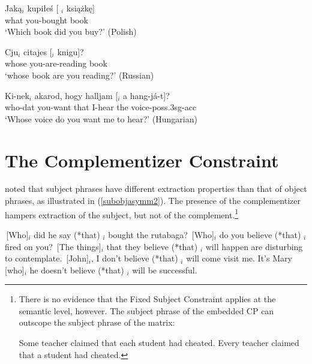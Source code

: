 \documentclass[output=paper]{langsci/langscibook}
\begin{document}
\ea
 \ea \gll Jak\k{a}$_i$  kupi\l{}e\'{s} { [ \spc$_i$ } ksi\k{a}\.{z}k\k{e}]\\
     what  you-bought  {} book\\
    \glt `Which book did you buy?' \hfill (Polish)
       
 \ex \gll Cju$_i$  citajes [\spc$_i$  knigu]?\\
 whose  you-are-reading {}  book\\
  \glt `whose book are you reading?' \hfill (Russian)
 
 \ex \gll Ki-nek$_i$  akarod,  hogy  halljam  {[\spc$_i$}  a  hang-j\'{a}-t]?\\
 who-{\sc dat}  you-want  that  I-hear {} the  voice-{\sc poss.3sg-acc}\\ 
\glt `Whose voice do you want me to hear?' \hfill (Hungarian)
 \z \label{lbcx}
 \z
 



 
 
\section{The Complementizer Constraint}

\citet{Perlmutter68} noted that subject phrases have different extraction properties than that of object phrases, as illustrated in (\ref{subobjasymm2}). The presence of the complementizer hampers extraction of the subject, but not of the complement.\footnote{There is no evidence that the Fixed Subject Constraint applies at the semantic level, however. The  subject phrase of the embedded CP can outscope the subject phrase of  the matrix:

\eal
\ex Some teacher claimed that each student had cheated.
\ex Every teacher claimed that a student had cheated.
\zllast
} 

\ea 
\ea \,[Who]$_i$ did he say (*that) \spc$_i$ bought the rutabaga?
\ex \,[Who]$_i$ do you believe (*that) \spc$_i$ fired on you? 
\ex \,[The things]$_i$ that they believe (*that) \spc$_i$ will happen are disturbing to contemplate. 
\ex \,[John]$_i$, I don't believe (*that) \spc$_i$ will come visit me. 
\ex It's Mary [who]$_i$ he doesn't believe (*that) \spc$_i$ will be successful.
\z \label{subobjasymm2}
\z

\end{document}
